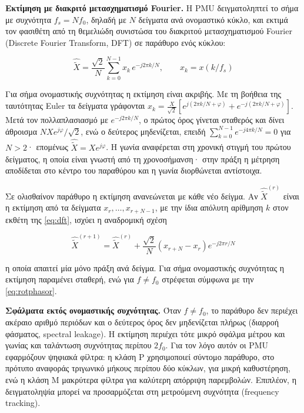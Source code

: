 \textbf{Εκτίμηση με διακριτό μετασχηματισμό Fourier.} Η PMU δειγματοληπτεί το σήμα με
συχνότητα $f_s = N f_0$, δηλαδή με $N$ δείγματα ανά ονομαστικό κύκλο, και εκτιμά τον
φασιθέτη από τη θεμελιώδη συνιστώσα του διακριτού μετασχηματισμού Fourier (Discrete Fourier
Transform, DFT) σε παράθυρο ενός κύκλου:

\begin{equation}
\hat{\tilde{X}} = \frac{\sqrt{2}}{N} \sum_{k=0}^{N-1} x_k\, e^{-j 2\pi k / N},
\qquad x_k = x(k/f_s)
\label{eq:dft}
\end{equation}

Για σήμα ονομαστικής συχνότητας η εκτίμηση είναι ακριβής. Με τη βοήθεια της ταυτότητας
Euler τα δείγματα γράφονται
$x_k = \frac{X}{\sqrt{2}}\left[e^{j(2\pi k/N + \varphi)} + e^{-j(2\pi k/N + \varphi)}\right]$.
Μετά τον πολλαπλασιασμό με $e^{-j2\pi k/N}$, ο πρώτος όρος γίνεται σταθερός και δίνει
άθροισμα $N X e^{j\varphi}/\sqrt{2}$, ενώ ο δεύτερος μηδενίζεται, επειδή
$\sum_{k=0}^{N-1} e^{-j4\pi k/N} = 0$ για $N > 2$· επομένως $\hat{\tilde{X}} = X e^{j\varphi}$.
Η γωνία αναφέρεται στη χρονική στιγμή του πρώτου δείγματος, η οποία είναι γνωστή από τη
χρονοσήμανση· στην πράξη η μέτρηση αποδίδεται στο κέντρο του παραθύρου και η γωνία
διορθώνεται αντίστοιχα.

Σε ολισθαίνον παράθυρο η εκτίμηση ανανεώνεται με κάθε νέο δείγμα. Αν $\hat{\tilde{X}}^{(r)}$
είναι η εκτίμηση από τα δείγματα $x_r, \ldots, x_{r+N-1}$, με την ίδια απόλυτη αρίθμηση
$k$ στον εκθέτη της \eqref{eq:dft}, ισχύει η αναδρομική σχέση

\begin{equation}
\hat{\tilde{X}}^{(r+1)} = \hat{\tilde{X}}^{(r)}
+ \frac{\sqrt{2}}{N}\left(x_{r+N} - x_r\right) e^{-j2\pi r/N}
\label{eq:recdft}
\end{equation}

η οποία απαιτεί μία μόνο πράξη ανά δείγμα. Για σήμα ονομαστικής συχνότητας η εκτίμηση
παραμένει σταθερή, ενώ για $f \neq f_0$ στρέφεται σύμφωνα με την \eqref{eq:rotphasor}.

\textbf{Σφάλματα εκτός ονομαστικής συχνότητας.} Όταν $f \neq f_0$, το παράθυρο δεν περιέχει
ακέραιο αριθμό περιόδων και ο δεύτερος όρος δεν μηδενίζεται πλήρως (διαρροή φάσματος,
spectral leakage). Η εκτίμηση περιέχει τότε μικρό σφάλμα μέτρου και γωνίας και ταλάντωση
συχνότητας περίπου $2f_0$. Για τον λόγο αυτόν οι PMU εφαρμόζουν ψηφιακά φίλτρα: η κλάση P
χρησιμοποιεί σύντομο παράθυρο, στο πρότυπο αναφοράς τριγωνικό μήκους περίπου δύο κύκλων, για
μικρή καθυστέρηση, ενώ η κλάση M μακρύτερα φίλτρα για καλύτερη απόρριψη παρεμβολών.
Επιπλέον, η δειγματοληψία μπορεί να προσαρμόζεται στη μετρούμενη συχνότητα (frequency
tracking).

